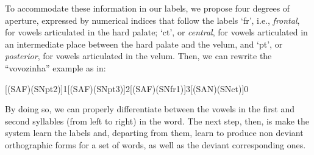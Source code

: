 To accommodate these information in our labels, we propose four degrees of aperture, expressed by numerical indices that follow the labels `fr', i.e., \emph{frontal}, for vowels articulated in the hard palate; `ct', or \emph{central}, for vowels articulated in an intermediate place between the hard palate and the velum, and `pt', or \emph{posterior}, for vowels articulated in the velum. Then, we can rewrite the ``vovozinha'' example as in:
\begin{center}
[(SAF)(SNpt2)]1[(SAF)(SNpt3)]2[(SAF)(SNfr1)]3[(SAN)(SNct)]0
\end{center}

By doing so, we can properly differentiate between the vowels in the first and second syllables (from left to right) in the word. The next step, then, is make the system learn the labels and, departing from them, learn to produce non deviant orthographic forms for a set of words, as well as the deviant corresponding ones.




